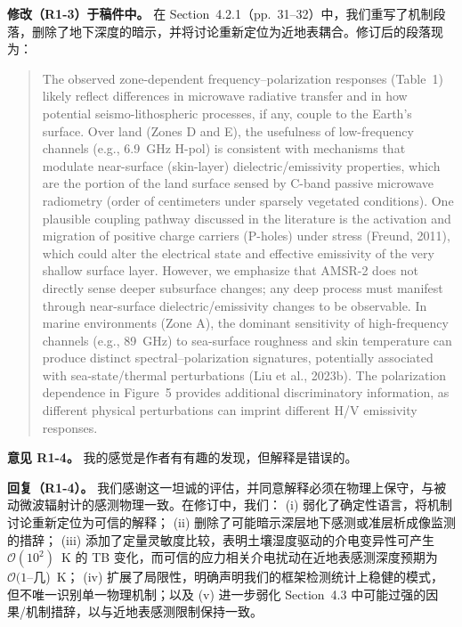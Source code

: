 \documentclass[11pt]{article}
\newcommand{\revcomment}[1]{\begingroup\color{commentcolor}#1\endgroup}
\newcommand{\revresponse}[1]{\begingroup\color{responsecolor}#1\endgroup}
\newcommand{\revchange}[1]{\begingroup\color{changecolor}#1\endgroup}
\begin{document}
\revchange{%
\textbf{修改（R1-3）于稿件中。}
在 Section~4.2.1（pp.~31--32）中，我们重写了机制段落，删除了地下深度的暗示，并将讨论重新定位为近地表耦合。修订后的段落现为：
\begin{quote}
The observed zone-dependent frequency--polarization responses (Table~1) likely reflect differences in microwave radiative transfer and in how potential seismo-lithospheric processes, if any, couple to the Earth's surface. Over land (Zones D and E), the usefulness of low-frequency channels (e.g., 6.9~GHz H-pol) is consistent with mechanisms that modulate near-surface (skin-layer) dielectric/emissivity properties, which are the portion of the land surface sensed by C-band passive microwave radiometry (order of centimeters under sparsely vegetated conditions). One plausible coupling pathway discussed in the literature is the activation and migration of positive charge carriers (P-holes) under stress (Freund, 2011), which could alter the electrical state and effective emissivity of the very shallow surface layer. However, we emphasize that AMSR-2 does not directly sense deeper subsurface changes; any deep process must manifest through near-surface dielectric/emissivity changes to be observable. In marine environments (Zone A), the dominant sensitivity of high-frequency channels (e.g., 89~GHz) to sea-surface roughness and skin temperature can produce distinct spectral--polarization signatures, potentially associated with sea-state/thermal perturbations (Liu et al., 2023b). The polarization dependence in Figure~5 provides additional discriminatory information, as different physical perturbations can imprint different H/V emissivity responses.
\end{quote}
}

\bigskip

\revcomment{%
\textbf{意见 R1-4。}
我的感觉是作者有有趣的发现，但解释是错误的。
}

\revresponse{%
\textbf{回复（R1-4）。}
我们感谢这一坦诚的评估，并同意解释必须在物理上保守，与被动微波辐射计的感测物理一致。在修订中，我们：
(i) 弱化了确定性语言，将机制讨论重新定位为可信的解释；
(ii) 删除了可能暗示深层地下感测或准层析成像监测的措辞；
(iii) 添加了定量灵敏度比较，表明土壤湿度驱动的介电变异性可产生 $\mathcal{O}(10^2)$~K 的 TB 变化，而可信的应力相关介电扰动在近地表感测深度预期为 $\mathcal{O}(1$--几)~K；
(iv) 扩展了局限性，明确声明我们的框架检测统计上稳健的模式，但不唯一识别单一物理机制；以及
(v) 进一步弱化 Section~4.3 中可能过强的因果/机制措辞，以与近地表感测限制保持一致。
}
\end{document}
